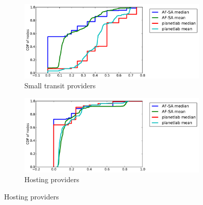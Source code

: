 \documentclass{sig-alternate-10pt}
\begin{document}
\begin{figure}
\begin{subfigure}[b]{0.45\textwidth}
\centering
    \includegraphics[width=1.0\linewidth]{figs/fractions_of_types-stp.pdf}
    \caption{Small transit providers}
\label{fig:as_stp}
\end{subfigure}
\begin{subfigure}[b]{0.45\textwidth}
\centering
    \includegraphics[width=1.0\linewidth]{figs/fractions_of_types-ahp.pdf}
    \caption{Hosting providers}
\label{fig:as_ahp}
\end{subfigure}


\end{figure}
\end{document}

